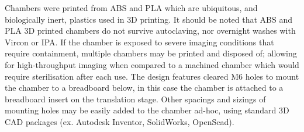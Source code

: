 Chambers were printed from ABS and PLA which are ubiquitous, and biologically inert, plastics used in \gls{3D printing}.
It should be noted that ABS and PLA 3D printed chambers do not survive autoclaving, nor overnight washes with Vircon or IPA.
If the chamber is exposed to severe imaging conditions that require containment, multiple chambers may be printed and disposed of; allowing for high-throughput imaging when compared to a machined chamber which would require sterilisation after each use.
The design features cleared M6 holes to mount the chamber to a breadboard below, in this case the chamber is attached to a breadboard insert on the translation stage.
Other spacings and sizings of mounting holes may be easily added to the chamber ad-hoc, using standard \gls{3D} \gls{CAD} packages (ex. Autodesk Inventor, SolidWorks, OpenScad).

